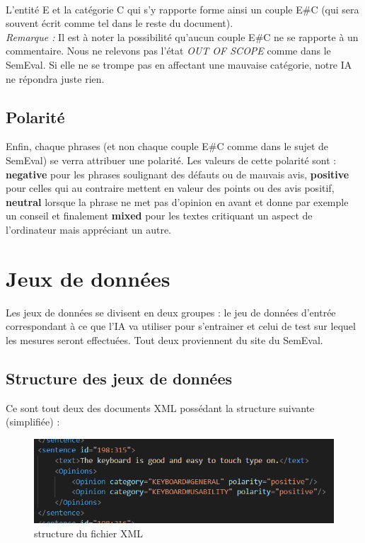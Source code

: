 \documentclass[12pt ,a4paper ]{article}
\begin{document}
\begin{multicols}{2}
\paragraph{} 
\noindent L'entité E et la catégorie C qui s'y rapporte forme ainsi un couple E\#C (qui sera souvent écrit comme tel dans le reste du document). \\

\noindent\textit{Remarque : }Il est à noter la possibilité qu'aucun couple E\#C ne se rapporte à un commentaire. Nous ne relevons pas l'état \textit{OUT OF SCOPE} comme dans le SemEval. Si elle ne se trompe pas en affectant une mauvaise catégorie, notre IA ne répondra juste rien. 

\subsection{Polarité}
Enfin, chaque phrases (et non chaque couple E\#C comme dans le sujet de SemEval) se verra attribuer une polarité. Les valeurs de cette polarité sont : \textbf{negative} pour les phrases soulignant des défauts ou de mauvais avis, \textbf{positive} pour celles qui au contraire mettent en valeur des points ou des avis positif, \textbf{neutral} lorsque la phrase ne met pas d'opinion en avant et donne par exemple un conseil et finalement \textbf{mixed} pour les textes critiquant un aspect de l'ordinateur mais appréciant un autre. 

\section{Jeux de données}
Les jeux de données se divisent en deux groupes : le jeu de données d'entrée correspondant à ce que l'IA va utiliser pour s'entrainer et celui de test sur lequel les mesures seront effectuées. Tout deux proviennent du site du SemEval. 

\subsection{Structure des jeux de données}
\noindent Ce sont tout deux des documents XML possédant la structure suivante (simplifiée) :  

\begin{figure}[H]
\begin{center}
\includegraphics[scale=0.55]{xml_struct.png}
\caption{\small{structure du fichier XML}}
\end{center}
\end{figure}


\end{multicols}
\end{document}
